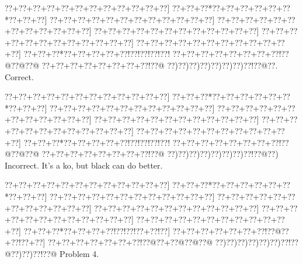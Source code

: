 \documentclass[a5paper]{article}
\begin{document}
\begin{center}
{\goo
\0??+\0??+\0??+\0??+\0??+\0??+\0??+\0??+\0??+\0??+\0??+\0??]
\0??+\0??+\0??*\0??+\0??+\0??+\0??+\0??+\0??*\0??+\0??+\0??]
\0??+\0??+\0??+\0??+\0??+\0??+\0??+\0??+\0??+\0??+\0??+\0??]
\0??+\0??+\0??+\0??+\0??+\0??+\0??+\0??+\0??+\0??+\0??+\0??]
\0??+\0??+\0??+\0??+\0??+\0??+\0??+\0??+\0??+\0??+\0??+\0??]
\0??+\0??+\0??+\0??+\0??+\0??+\0??+\0??+\0??+\0??+\0??+\0??]
\0??+\0??+\0??+\0??+\0??+\0??+\0??+\0??+\0??+\0??+\0??+\0??]
\0??+\0??+\0??*\0??+\0??+\0??+\0??+\0??!\0??!\0??!\0??!\0??!
\0??+\0??+\0??+\0??+\0??+\0??+\0??+\0??!\0??@\0??@\0??@
\0??+\0??+\0??+\0??+\0??+\0??+\0??+\0??!\0??@
\0??)\0??)\0??)\0??)\0??)\0??)\0??)\0??!\0??@\0??.
}
Correct. 

\end{center}
\begin{center}
{\goo
\0??+\0??+\0??+\0??+\0??+\0??+\0??+\0??+\0??+\0??+\0??+\0??]
\0??+\0??+\0??*\0??+\0??+\0??+\0??+\0??+\0??*\0??+\0??+\0??]
\0??+\0??+\0??+\0??+\0??+\0??+\0??+\0??+\0??+\0??+\0??+\0??]
\0??+\0??+\0??+\0??+\0??+\0??+\0??+\0??+\0??+\0??+\0??+\0??]
\0??+\0??+\0??+\0??+\0??+\0??+\0??+\0??+\0??+\0??+\0??+\0??]
\0??+\0??+\0??+\0??+\0??+\0??+\0??+\0??+\0??+\0??+\0??+\0??]
\0??+\0??+\0??+\0??+\0??+\0??+\0??+\0??+\0??+\0??+\0??+\0??]
\0??+\0??+\0??*\0??+\0??+\0??+\0??+\0??!\0??!\0??!\0??!\0??!
\0??+\0??+\0??+\0??+\0??+\0??+\0??+\0??!\0??@\0??@\0??@
\0??+\0??+\0??+\0??+\0??+\0??+\0??+\0??!\0??@
\0??)\0??)\0??)\0??)\0??)\0??)\0??)\0??!\0??@\0??)
}
Incorrect. It's a ko, but black can do better. 

\end{center}
\newpage
\begin{center}
{\goo
\0??+\0??+\0??+\0??+\0??+\0??+\0??+\0??+\0??+\0??+\0??+\0??]
\0??+\0??+\0??*\0??+\0??+\0??+\0??+\0??+\0??*\0??+\0??+\0??]
\0??+\0??+\0??+\0??+\0??+\0??+\0??+\0??+\0??+\0??+\0??+\0??]
\0??+\0??+\0??+\0??+\0??+\0??+\0??+\0??+\0??+\0??+\0??+\0??]
\0??+\0??+\0??+\0??+\0??+\0??+\0??+\0??+\0??+\0??+\0??+\0??]
\0??+\0??+\0??+\0??+\0??+\0??+\0??+\0??+\0??+\0??+\0??+\0??]
\0??+\0??+\0??+\0??+\0??+\0??+\0??+\0??+\0??+\0??+\0??+\0??]
\0??+\0??+\0??*\0??+\0??+\0??+\0??!\0??!\0??!\0??+\0??!\0??]
\0??+\0??+\0??+\0??+\0??+\0??+\0??!\0??@\0??+\0??!\0??+\0??]
\0??+\0??+\0??+\0??+\0??+\0??+\0??!\0??@\0??+\0??@\0??@\0??@
\0??)\0??)\0??)\0??)\0??)\0??)\0??!\0??@\0??)\0??)\0??!\0??@
}
Problem 4.

\end{center}
\end{document}
